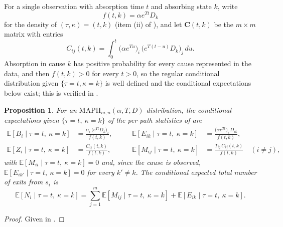 \documentclass{article}
\newtheorem{proposition}{Proposition}
\newcommand{\ex}[1]{\mathbb{E}\left[#1\right]}
\newcommand{\subchg}[1]{#1}
\begin{document}
For a single observation with absorption time $t$ and absorbing state $k$, write
\[
f(t,k) = \alpha e^{Tt}D_k
\]
for the density of $(\tau,\kappa)=(t,k)$ (item (ii) of ), and let $\mathbf C(t,k)$ be the $m\times m$ matrix with entries
\begin{equation}
\label{eq:estep-fC}
C_{ij}(t,k) = \int_0^t \big(\alpha e^{Tu}\big)_i\,\big(e^{T(t-u)}D_k\big)_j \, du .
\end{equation}
Absorption in cause $k$ has positive probability for every cause represented in the data, and
then $f(t,k)>0$ for every $t>0$, so the regular conditional distribution given
$\{\tau=t,\kappa=k\}$ is well defined and the conditional expectations below exist; this is
verified in .

\begin{proposition}
\label{prop:e-step}
For an $\text{MAPH}_{m,n}(\alpha,T,D)$ distribution, the conditional expectations given $\{\tau=t,\ \kappa=k\}$ of the per-path statistics of  are
\begin{equation}
\label{eq:cond-exp-estats}
\begin{aligned}
\ex{B_i \mid \tau=t,\ \kappa=k} &= \frac{\alpha_i\,\big(e^{Tt}D_k\big)_i}{f(t,k)}, &\qquad
\ex{E_{ik} \mid \tau=t,\ \kappa=k} &= \frac{\big(\alpha e^{Tt}\big)_i\,D_{ik}}{f(t,k)},\\[2pt]
\ex{Z_i \mid \tau=t,\ \kappa=k} &= \frac{C_{ii}(t,k)}{f(t,k)}, &\qquad
\ex{M_{ij} \mid \tau=t,\ \kappa=k} &= \frac{T_{ij}\,C_{ij}(t,k)}{f(t,k)}\quad(i\neq j),
\end{aligned}
\end{equation}
with $\ex{M_{ii} \mid \tau=t,\ \kappa=k}=0$ \subchg{and, since the cause is observed,
$\ex{E_{ik'} \mid \tau=t,\ \kappa=k}=0$ for every $k'\neq k$}. The conditional expected total number
of exits from $s_i$ is
\begin{equation}
\label{eq:e-step-N-total}
\ex{N_i \mid \tau=t,\ \kappa=k} = \sum_{j=1}^m \ex{M_{ij} \mid \tau=t,\ \kappa=k} + \ex{E_{ik} \mid \tau=t,\ \kappa=k}.
\end{equation}
\end{proposition}

\begin{proof}
Given in .
\end{proof}
\end{document}

